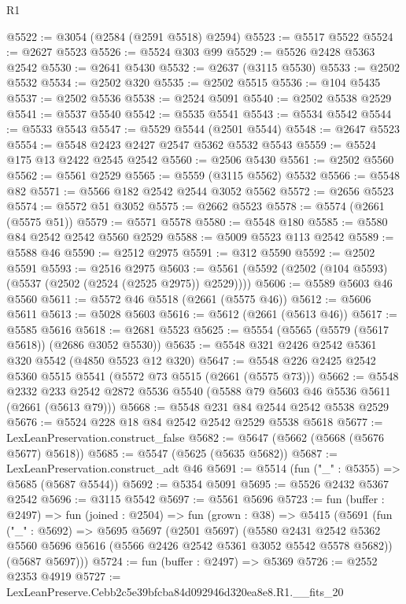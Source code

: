 \begin{lexlean}{R1}
\begin{coremodule}
@5522 := @3054 (@2584 (@2591 @5518) @2594)
@5523 := @5517 @5522
@5524 := @2627 @5523
@5526 := @5524 @303 @99
@5529 := @5526 @2428 @5363 @2542
@5530 := @2641 @5430
@5532 := @2637 (@3115 @5530)
@5533 := @2502 @5532
@5534 := @2502 @320
@5535 := @2502 @5515
@5536 := @104 @5435
@5537 := @2502 @5536
@5538 := @2524 @5091
@5540 := @2502 @5538 @2529
@5541 := @5537 @5540
@5542 := @5535 @5541
@5543 := @5534 @5542
@5544 := @5533 @5543
@5547 := @5529 @5544 (@2501 @5544)
@5548 := @2647 @5523
@5554 := @5548 @2423 @2427 @2547 @5362 @5532 @5543
@5559 := @5524 @175 @13 @2422 @2545 @2542
@5560 := @2506 @5430
@5561 := @2502 @5560
@5562 := @5561 @2529
@5565 := @5559 (@3115 @5562) @5532
@5566 := @5548 @82
@5571 := @5566 @182 @2542 @2544 @3052 @5562
@5572 := @2656 @5523
@5574 := @5572 @51 @3052
@5575 := @2662 @5523
@5578 := @5574 (@2661 (@5575 @51))
@5579 := @5571 @5578
@5580 := @5548 @180
@5585 := @5580 @84 @2542 @2542 @5560 @2529
@5588 := @5009 @5523 @113 @2542
@5589 := @5588 @46
@5590 := @2512 @2975
@5591 := @312 @5590
@5592 := @2502 @5591
@5593 := @2516 @2975
@5603 := @5561 (@5592 (@2502 (@104 @5593) (@5537 (@2502 (@2524 (@2525 @2975)) @2529))))
@5606 := @5589 @5603 @46 @5560
@5611 := @5572 @46 @5518 (@2661 (@5575 @46))
@5612 := @5606 @5611
@5613 := @5028 @5603
@5616 := @5612 (@2661 (@5613 @46))
@5617 := @5585 @5616
@5618 := @2681 @5523
@5625 := @5554 (@5565 (@5579 (@5617 @5618)) (@2686 @3052 @5530))
@5635 := @5548 @321 @2426 @2542 @5361 @320 @5542 (@4850 @5523 @12 @320)
@5647 := @5548 @226 @2425 @2542 @5360 @5515 @5541 (@5572 @73 @5515 (@2661 (@5575 @73)))
@5662 := @5548
    @2332
    @233
    @2542
    @2872
    @5536
    @5540
    (@5588 @79 @5603 @46 @5536 @5611 (@2661 (@5613 @79)))
@5668 := @5548 @231 @84 @2544 @2542 @5538 @2529
@5676 := @5524 @228 @18 @84 @2542 @2542 @2529 @5538 @5618
@5677 := LexLeanPreservation.construct_false
@5682 := @5647 (@5662 (@5668 (@5676 @5677) @5618))
@5685 := @5547 (@5625 (@5635 @5682))
@5687 := LexLeanPreservation.construct_adt @46
@5691 := @5514 (fun ("_" : @5355) => @5685 (@5687 @5544))
@5692 := @5354 @5091
@5695 := @5526 @2432 @5367 @2542
@5696 := @3115 @5542
@5697 := @5561 @5696
@5723 := fun (buffer : @2497) =>
  fun (joined : @2504) =>
  fun (grown : @38) =>
  @5415
    (@5691
      (fun ("_" : @5692) =>
      @5695
        @5697
        (@2501 @5697)
        (@5580
          @2431
          @2542
          @5362
          @5560
          @5696
          @5616
          (@5566 @2426 @2542 @5361 @3052 @5542 @5578 @5682))
        (@5687 @5697)))
@5724 := fun (buffer : @2497) => @5369
@5726 := @2552 @2353 @4919
@5727 := LexLeanPreserve.Cebb2c5e39bfcba84d092946d320ea8e8.R1.__fits_20

\end{coremodule}
\end{lexlean}
